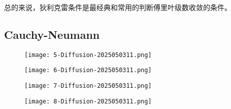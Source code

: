 总的来说，狄利克雷条件是最经典和常用的判断傅里叶级数收敛的条件。

\subsection{Cauchy-Neumann}

\begin{figure}[H]
\centering
\texttt{[image: 5-Diffusion-2025050311.png]}
\label{}
\end{figure}
\begin{figure}[H]
\centering
\texttt{[image: 6-Diffusion-2025050311.png]}
\label{}
\end{figure}
\begin{figure}[H]
\centering
\texttt{[image: 7-Diffusion-2025050311.png]}
\label{}
\end{figure}
\begin{figure}[H]
\centering
\texttt{[image: 8-Diffusion-2025050311.png]}
\label{}
\end{figure}

